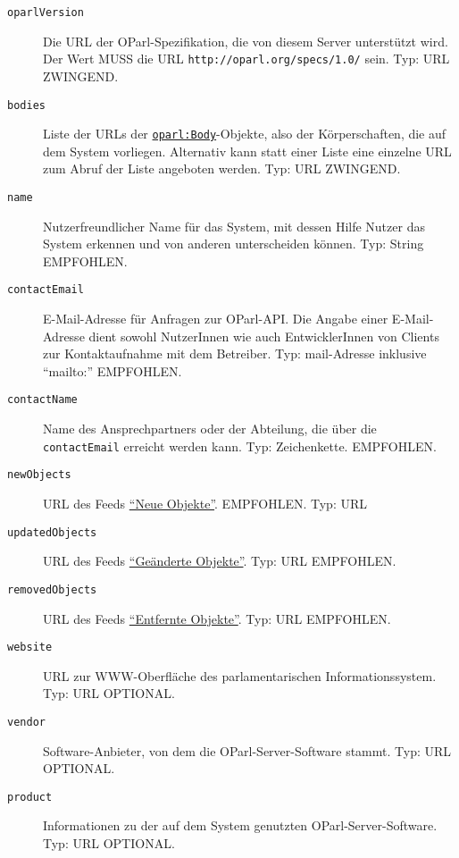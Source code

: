\documentclass[,a4paper]{article}
\begin{document}
\begin{description}
\item[\texttt{oparlVersion}]
Die URL der OParl-Spezifikation, die von diesem Server unterstützt wird.
Der Wert MUSS die URL \texttt{http://oparl.org/specs/1.0/} sein. Typ:
URL ZWINGEND.
\item[\texttt{bodies}]
Liste der URLs der
\hyperref[oparlux5fbody]{\texttt{oparl:Body}}-Objekte, also der
Körperschaften, die auf dem System vorliegen. Alternativ kann statt
einer Liste eine einzelne URL zum Abruf der Liste angeboten werden. Typ:
URL ZWINGEND.
\item[\texttt{name}]
Nutzerfreundlicher Name für das System, mit dessen Hilfe Nutzer das
System erkennen und von anderen unterscheiden können. Typ: String
EMPFOHLEN.
\item[\texttt{contactEmail}]
E-Mail-Adresse für Anfragen zur OParl-API. Die Angabe einer
E-Mail-Adresse dient sowohl NutzerInnen wie auch EntwicklerInnen von
Clients zur Kontaktaufnahme mit dem Betreiber. Typ: mail-Adresse
inklusive ``mailto:'' EMPFOHLEN.
\item[\texttt{contactName}]
Name des Ansprechpartners oder der Abteilung, die über die
\texttt{contactEmail} erreicht werden kann. Typ: Zeichenkette.
EMPFOHLEN.
\item[\texttt{newObjects}]
URL des Feeds \hyperref[feedux5fneueux5fobjekte]{``Neue Objekte''}.
EMPFOHLEN. Typ: URL
\item[\texttt{updatedObjects}]
URL des Feeds \hyperref[feedux5fgeaenderteux5fobjekte]{``Geänderte
Objekte''}. Typ: URL EMPFOHLEN.
\item[\texttt{removedObjects}]
URL des Feeds \hyperref[feedux5fentfernteux5fobjekte]{``Entfernte
Objekte''}. Typ: URL EMPFOHLEN.
\item[\texttt{website}]
URL zur WWW-Oberfläche des parlamentarischen Informationssystem. Typ:
URL OPTIONAL.
\item[\texttt{vendor}]
Software-Anbieter, von dem die OParl-Server-Software stammt. Typ: URL
OPTIONAL.
\item[\texttt{product}]
Informationen zu der auf dem System genutzten OParl-Server-Software.
Typ: URL OPTIONAL.
\end{description}

\end{document}
